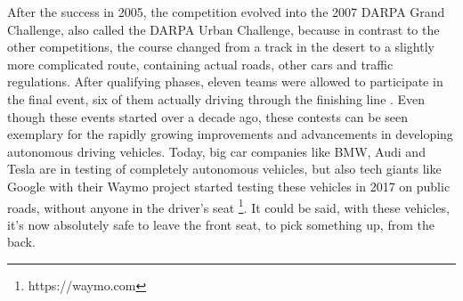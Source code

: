 After the success in 2005, the competition evolved into the 2007 DARPA Grand Challenge, also called the DARPA Urban Challenge, because in contrast to the other competitions, the course changed from a track in the desert to a slightly more complicated route, containing actual roads, other cars and traffic regulations. After qualifying phases, eleven teams were allowed to participate in the final event, six of them actually driving through the finishing line \cite{darpa2007}.\newline
Even though these events started over a decade ago, 
these contests can be seen exemplary for the rapidly growing improvements and advancements in developing autonomous driving vehicles. Today, big car companies like BMW, Audi and Tesla are in testing of completely autonomous vehicles, but also tech giants like Google with their Waymo project  started testing these vehicles in 2017 on public roads, without anyone in the driver's seat \footnote{https://waymo.com}. It could be said, with these vehicles, it's now absolutely safe to leave the front seat, to pick something up, from the back. 
